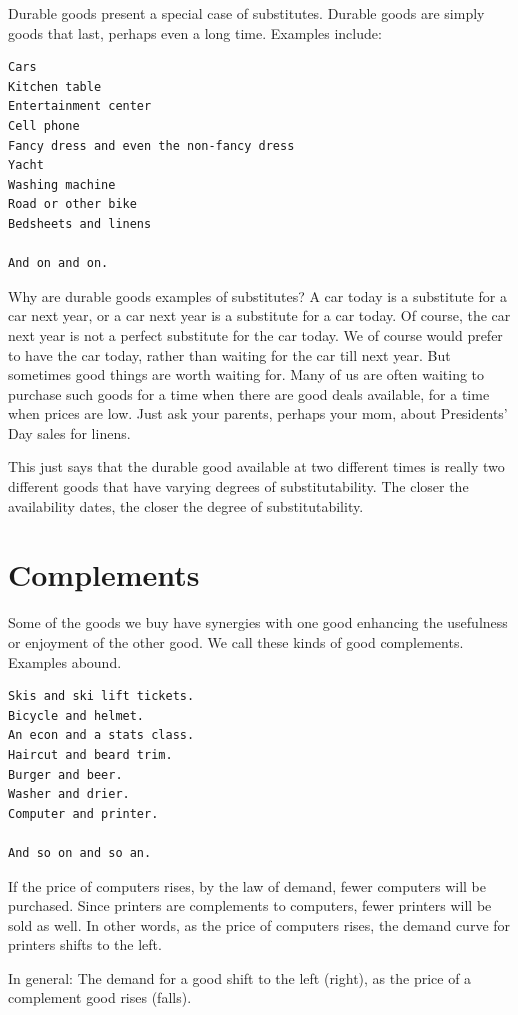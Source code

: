 \documentclass[
]{book}
\begin{document}
Durable goods present a special case of substitutes. Durable goods are simply goods that last, perhaps even a long time. Examples include:

\begin{verbatim}
Cars
Kitchen table
Entertainment center
Cell phone
Fancy dress and even the non-fancy dress
Yacht
Washing machine
Road or other bike
Bedsheets and linens

And on and on. 
\end{verbatim}

Why are durable goods examples of substitutes? A car today is a substitute for a car next year, or a car next year is a substitute for a car today. Of course, the car next year is not a perfect substitute for the car today. We of course would prefer to have the car today, rather than waiting for the car till next year. But sometimes good things are worth waiting for. Many of us are often waiting to purchase such goods for a time when there are good deals available, for a time when prices are low. Just ask your parents, perhaps your mom, about Presidents' Day sales for linens.

This just says that the durable good available at two different times is really two different goods that have varying degrees of substitutability. The closer the availability dates, the closer the degree of substitutability.

\hypertarget{complements}{%
\section{Complements}\label{complements}}

Some of the goods we buy have synergies with one good enhancing the usefulness or enjoyment of the other good. We call these kinds of good complements. Examples abound.

\begin{verbatim}
Skis and ski lift tickets.
Bicycle and helmet.
An econ and a stats class.
Haircut and beard trim.
Burger and beer.
Washer and drier.
Computer and printer.

And so on and so an.
\end{verbatim}

If the price of computers rises, by the law of demand, fewer computers will be purchased. Since printers are complements to computers, fewer printers will be sold as well. In other words, as the price of computers rises, the demand curve for printers shifts to the left.

In general: The demand for a good shift to the left (right), as the price of a complement good rises (falls).
\end{document}
